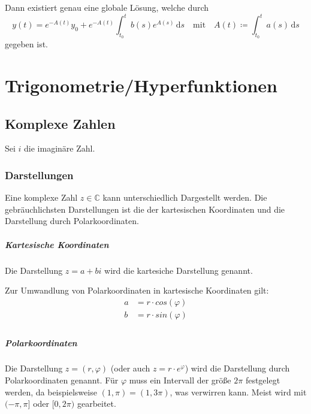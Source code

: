 \documentclass[a4paper, 11pt, accentcolor = tud3b]{tudreport}
\begin{document}
                Dann existiert genau eine globale Lösung, welche durch
                \begin{equation*}
                    y(t) = e ^ { -A(t) } y _ 0 + e ^ { -A(t) } \int _ { t _ 0 } ^ t \! b(s) e ^ { A(s) } \, \mathrm{d}s \quad\text{mit}\quad A(t) \coloneqq \int _ { t _ 0 } ^ t \! a(s) \, \mathrm{d}s
                \end{equation*}
                gegeben ist.

            \paragraph{}

    \chapter{Trigonometrie/Hyperfunktionen}
        \section{Komplexe Zahlen}
            Sei $ i $ die imaginäre Zahl.

            \subsection{Darstellungen}
                Eine komplexe Zahl $ z \in \mathbb{C} $ kann unterschiedlich Dargestellt werden. Die gebräuchlichsten Darstellungen ist die der kartesischen Koordinaten und die Darstellung durch Polarkoordinaten.

                \paragraph{Kartesische Koordinaten}
                    Die Darstellung $ z = a + bi $ wird die kartesiche Darstellung genannt.

                    Zur Umwandlung von Polarkoordinaten in kartesische Koordinaten gilt:
                    \begin{align*}
                        a &= r \cdot cos(\varphi) \\
                        b &= r \cdot sin(\varphi) \\
                    \end{align*}

                \paragraph{Polarkoordinaten}
                    Die Darstellung $ z = (r, \varphi) $ (oder auch $ z = r \cdot e ^ \varphi $) wird die Darstellung durch Polarkoordinaten genannt. Für $ \varphi $ muss ein Intervall der größe $ 2\pi $ festgelegt werden, da beispielsweise $ (1, \pi) = (1, 3\pi) $, was verwirren kann. Meist wird mit $ (-\pi, \pi] $ oder $ [0, 2\pi) $ gearbeitet.
\end{document}
